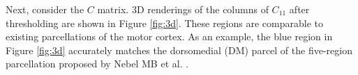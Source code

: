 \documentclass[fleqn,12pt]{article}
\let\oldref\ref
\renewcommand{\ref}[1]{(\oldref{#1})}
\begin{document}
Next, consider the $C$ matrix. 3D renderings of the columns of $C_{11}$ after thresholding are shown in Figure \oldref{fig:3d}. These regions are comparable to existing parcellations of the motor cortex. As an example, the blue region in Figure \oldref{fig:3d} accurately matches the dorsomedial (DM) parcel of the five-region parcellation proposed by Nebel MB et al. \citep{nebel2014disruption}.
%
%
%
%
%
%
\begin{center}
\[
\begin{array}{lll}

\end{array}\]
\end{center}
\end{document}
